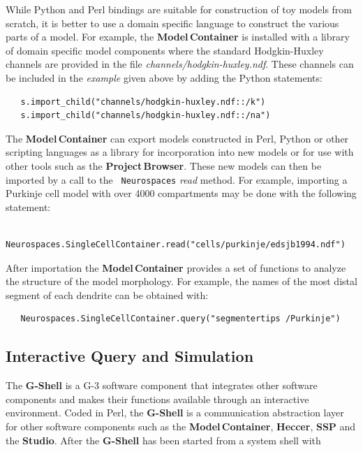 \documentclass[12pt]{article}
\begin{document}
\vspace*{1cm}

While Python and Perl bindings are suitable for construction of toy
models from scratch, it is better to use a domain specific language to
construct the various parts of a model. For example, the {\bf
  Model\,Container} is installed with a library of domain specific
model components where the standard Hodgkin-Huxley channels are
provided in the file {\it channels/hodgkin-huxley.ndf}.  These
channels can be included in the {\it example} given above by adding
the Python statements:

{\footnotesize
\begin{verbatim}
   s.import_child("channels/hodgkin-huxley.ndf::/k")
   s.import_child("channels/hodgkin-huxley.ndf::/na")
\end{verbatim}
}

The {\bf Model\,Container} can export models constructed in Perl, Python or other
scripting languages as a library for incorporation into new models or
for use with other tools such as the {\bf Project\,Browser}.
These new models can then be imported by a call to the {\tt
  Neurospaces} {\it read} method. For example, importing a Purkinje
cell model with over 4000 compartments may be done with the following
statement:

{\footnotesize
\begin{verbatim}
   Neurospaces.SingleCellContainer.read("cells/purkinje/edsjb1994.ndf")
\end{verbatim}
}

After importation the {\bf Model\,Container} provides a set of
functions to analyze the structure of the model morphology.  For
example, the names of the most distal segment of each dendrite can be
obtained with:

{\footnotesize
\begin{verbatim}
   Neurospaces.SingleCellContainer.query("segmentertips /Purkinje")
\end{verbatim}
}

\subsection{Interactive Query and Simulation}

The {\bf G-Shell} is a G-3 software component that integrates other
software components and makes their functions available through an
interactive environment.  Coded in Perl, the {\bf G-Shell} is a
communication abstraction layer for other software components such as
the {\bf Model\,Container}, {\bf Heccer}, {\bf SSP} and the {\bf
  Studio}.  After the {\bf G-Shell} has been started from a system
shell with
\end{document}
